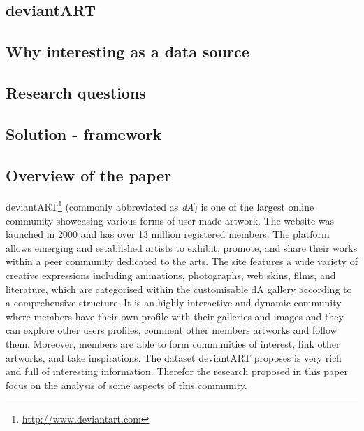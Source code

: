 \subsection{deviantART}
\subsection{Why interesting as a data source}
\subsection{Research questions}
\subsection{Solution - framework}
\subsection{Overview of the paper}

deviantART\footnote{\url{http://www.deviantart.com}} (commonly abbreviated as \textit{dA}) is one of the largest online community showcasing various forms of user-made artwork. The website was launched in 2000 and has over 13 million registered members.
The platform allows emerging and established artists to exhibit, promote, and share their works within a peer community dedicated to the arts. 
The site features a wide variety of creative expressions including animations, photographs, web skins, films, and literature, which are categorised within the customisable dA gallery according to a comprehensive structure. 
It is an highly interactive and dynamic community where members have their own profile with their galleries and images and they can explore other users profiles, comment other members artworks and follow them. Moreover, members are able to form communities of interest, link other artworks, and take inspirations.
The dataset deviantART proposes is very rich and full of interesting information. Therefor the research proposed in this paper focus on the analysis of some aspects of this community. 


